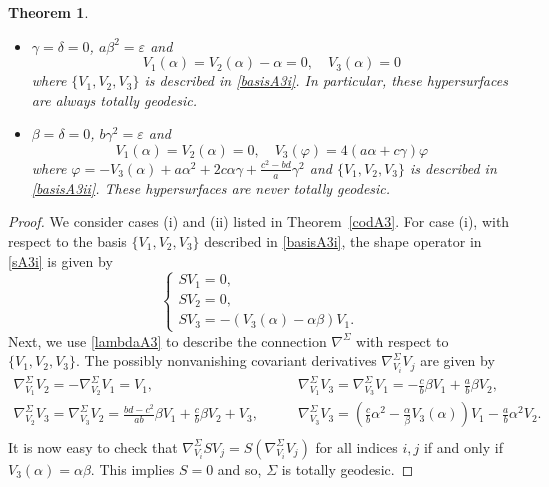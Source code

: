 \documentclass{amsart}
\theoremstyle{plain}
\newtheorem{theorem}{Theorem}
\theoremstyle{remark}
\begin{document}
{\begin{theorem}
\begin{itemize}
\item[(1)]  $\gamma=\delta=0$, $a\beta^2=\varepsilon$ and
%
\[
V_1(\alpha)=V_2(\alpha)-\alpha=0,\quad V_3(\alpha) = 0
\]
%
where $\{V_1,V_2,V_3\}$ is described in \eqref{basisA3i}. In particular, these hypersurfaces are always totally geodesic.
\vspace{1mm} 
\item[(2)] $\beta=\delta=0$, $b\gamma^2=\varepsilon$ and
\[
V_1(\alpha)=V_2(\alpha)=0,\quad V_3(\varphi) = 4(a\alpha+c\gamma)\varphi
\]
%
where $\varphi=- V_3(\alpha)+a\alpha^2+2c\alpha\gamma +\frac{c^2-bd}{a}\gamma^2$ and $\{V_1,V_2,V_3\}$ is described in \eqref{basisA3ii}. These hypersurfaces are never totally geodesic.
\end{itemize}
\end{theorem} 
\begin{proof}
We consider cases (i) and (ii) listed in Theorem~\ref{codA3}. For case (i), with respect to the basis $\{V_1,V_2,V_3\}$  described in \eqref{basisA3i}, the shape operator in \eqref{sA3i} is given by
\[
\left\{
\begin{array}{l}
SV_1 =  0, \\[2 pt]
SV_2 =  0, \\[2 pt]
SV_3 =  -(V_3(\alpha)-\alpha\beta)V_1.
\end{array}
\right.
\]
Next, we use \eqref{lambdaA3} to describe the connection $\nabla^{\Sigma}$ with respect to $\{V_1,V_2,V_3\}$. The possibly nonvanishing covariant derivatives $\nabla^\Sigma _{V_i} V_j$ are given by
%
\[
\begin{array}{ll}
\nabla^\Sigma _{V_1} V_2 =-\nabla^\Sigma _{V_2} V_1 =  V_1, \qquad &
\nabla^\Sigma _{V_1} V_3 = \nabla^\Sigma _{V_3} V_1 = -\frac cb \beta V_1 +\frac ab \beta V_2 , \\[8 pt]
\nabla^\Sigma _{V_2} V_3 = \nabla^\Sigma _{V_3} V_2 = \frac{bd-c^2}{ab} \beta V_1 +\frac cb \beta V_2 +V_3, \qquad &
\nabla^\Sigma _{V_3} V_3 = \left( \frac cb \alpha ^2 -\frac{\alpha}{\beta} V_3(\alpha) \right) V_1-\frac ab \alpha ^2 V_2 .\\[4 pt]
\end{array}
\]
%
It is now easy to check that $\nabla^\Sigma _{V_i} SV_j=S (\nabla^\Sigma _{V_i} V_j)$ for all indices $i,j$ if and only if $V_3(\alpha)=\alpha\beta$. This implies $S=0$ and so, $\Sigma$ is totally geodesic.


\end{proof}}
\end{document}
